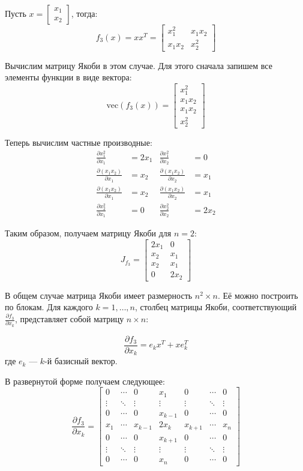 \documentclass{article}
\begin{document}
Пусть \(x = \begin{bmatrix} x_1 \\ x_2 \end{bmatrix}\), тогда:
\[
f_3(x) = x x^T = \begin{bmatrix}
x_1^2 & x_1x_2 \\
x_1x_2 & x_2^2
\end{bmatrix}
\]

Вычислим матрицу Якоби в этом случае. Для этого сначала запишем все элементы функции в виде вектора:
\[
\text{vec}(f_3(x)) = \begin{bmatrix}
x_1^2 \\ x_1x_2 \\ x_1x_2 \\ x_2^2
\end{bmatrix}
\]

Теперь вычислим частные производные:
\begin{align*}
\frac{\partial x_1^2}{\partial x_1} &= 2x_1 &
\frac{\partial x_1^2}{\partial x_2} &= 0 \\
\frac{\partial (x_1x_2)}{\partial x_1} &= x_2 &
\frac{\partial (x_1x_2)}{\partial x_2} &= x_1 \\
\frac{\partial (x_1x_2)}{\partial x_1} &= x_2 &
\frac{\partial (x_1x_2)}{\partial x_2} &= x_1 \\
\frac{\partial x_2^2}{\partial x_1} &= 0 &
\frac{\partial x_2^2}{\partial x_2} &= 2x_2
\end{align*}

Таким образом, получаем матрицу Якоби для \(n = 2\):
\[
J_{f_3} = \begin{bmatrix}
2x_1 & 0 \\
x_2 & x_1 \\
x_2 & x_1 \\
0 & 2x_2
\end{bmatrix}
\]

В общем случае матрица Якоби имеет размерность \(n^2 \times n\). Её можно построить по блокам. Для каждого \(k = 1, \ldots, n\), столбец матрицы Якоби, соответствующий \(\frac{\partial f_3}{\partial x_k}\), представляет собой матрицу \(n \times n\):

\[
\frac{\partial f_3}{\partial x_k} = e_k x^T + x e_k^T
\]
где \(e_k\) — \(k\)-й базисный вектор.

\quad

В развернутой форме получаем следующее:
\[
\frac{\partial f_3}{\partial x_k} = \begin{bmatrix}
0 & \cdots & 0 & x_1 & 0 & \cdots & 0 \\
\vdots & \ddots & \vdots & \vdots & \vdots & \ddots & \vdots \\
0 & \cdots & 0 & x_{k-1} & 0 & \cdots & 0 \\
x_1 & \cdots & x_{k-1} & 2x_k & x_{k+1} & \cdots & x_n \\
0 & \cdots & 0 & x_{k+1} & 0 & \cdots & 0 \\
\vdots & \ddots & \vdots & \vdots & \vdots & \ddots & \vdots \\
0 & \cdots & 0 & x_n & 0 & \cdots & 0
\end{bmatrix}
\]
\end{document}
